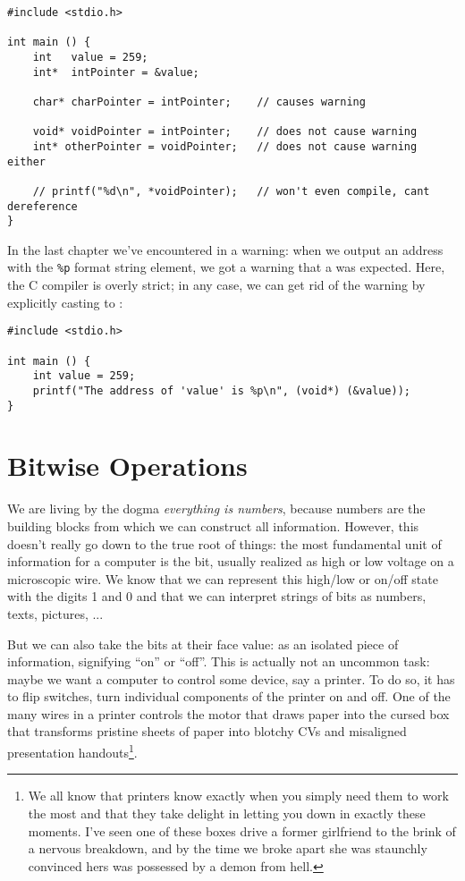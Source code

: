 {\begin{codebox}[voidPointer.c]
\begin{verbatim}
#include <stdio.h>

int main () {
    int   value = 259;
    int*  intPointer = &value;
    
    char* charPointer = intPointer;    // causes warning
    
    void* voidPointer = intPointer;    // does not cause warning
    int* otherPointer = voidPointer;   // does not cause warning either
    
    // printf("%d\n", *voidPointer);   // won't even compile, cant dereference
}
\end{verbatim}
\end{codebox}

In the last chapter we've encountered  in a warning: when we output an address with the \texttt{\%p} format string element, we got a warning that a  was expected. Here, the C compiler is overly strict; in any case, we can get rid of the warning by explicitly casting to :

\begin{codebox}[printAddress.c]
\begin{verbatim}
#include <stdio.h>

int main () {
    int value = 259;
    printf("The address of 'value' is %p\n", (void*) (&value));
}
\end{verbatim}
\end{codebox}


\section{Bitwise Operations}
We are living by the dogma \emph{everything is numbers}, because numbers are the building blocks from which we can construct all information. However, this doesn't really go down to the true root of things: the most fundamental unit of information for a computer is the bit, usually realized as high or low voltage on a microscopic wire. We know that we can represent this high/low or on/off state with the digits 1 and 0 and that we can interpret strings of bits as numbers, texts, pictures, ...

But we can also take the bits at their face value: as an isolated piece of information, signifying \enquote{on} or \enquote{off}. This is actually not an uncommon task: maybe we want a computer to control some device, say a printer. To do so, it has to flip switches, turn individual components of the printer on and off. One of the many wires in a printer controls the motor that draws paper into the cursed box that transforms pristine sheets of paper into blotchy CVs and misaligned presentation handouts\footnote{We all know that printers know exactly when you simply need them to work the most and that they take delight in letting you down in exactly these moments. I've seen one of these boxes drive a former girlfriend to the brink of a nervous breakdown, and by the time we broke apart she was staunchly convinced hers was possessed by a demon from hell.}.

}
